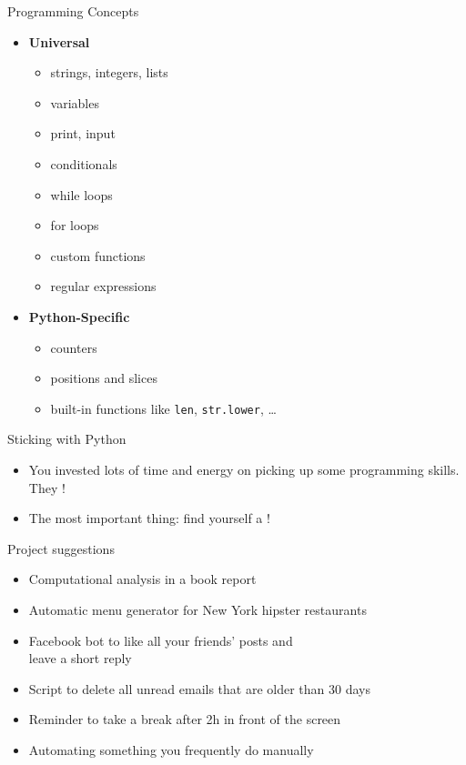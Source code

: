 \documentclass[xcolor={usenames,svgnames,x11names,dvipsnames,table}]{beamer}
\begin{document}
\begin{frame}{Programming Concepts}
    \begin{itemize}
        \item \textbf{Universal}
            \begin{itemize}
                \item strings, integers, lists
                \item variables
                \item print, input
                \item conditionals
                \item while loops
                \item for loops
                \item custom functions
                \item regular expressions
            \end{itemize}
        \item \textbf{Python-Specific}
            \begin{itemize}
                \item counters
                \item positions and slices
                \item built-in functions like \texttt{len}, \texttt{str.lower}, \ldots
            \end{itemize}
    \end{itemize}
\end{frame}

\begin{frame}{Sticking with Python}
    \begin{itemize}
        \item You invested lots of time and energy on picking up some programming skills.
              They !
        \item The most important thing: find yourself a !
    \end{itemize}

    \begin{block}{Project suggestions}
        \begin{itemize}
            \item Computational analysis in a book report
            \item Automatic menu generator for New York hipster restaurants
            \item Facebook bot to like all your friends' posts and\\
                  leave a short reply
            \item Script to delete all unread emails that are older than 30 days
            \item Reminder to take a break after 2h in front of the screen
            \item Automating something you frequently do manually
        \end{itemize}
    \end{block}
\end{frame}
\end{document}
